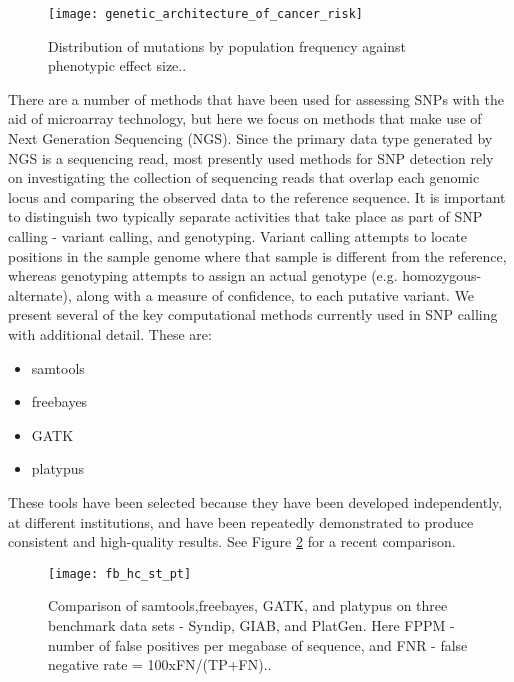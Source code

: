 \begin{figure}[H]
    \texttt{[image: genetic\_architecture\_of\_cancer\_risk]}
    \centering
    \caption {Distribution of mutations by population frequency against phenotypic effect size.\autocite{weitzel2011genetics}.}
    \label{fig:genetic_architecture_of_cancer_risk}
\end{figure}

There are a number of methods that have been used for assessing SNPs with the aid of microarray technology\autocite{heller2002dna}, but here we focus on methods that make use of Next Generation Sequencing (NGS). Since the primary data type generated by NGS is a sequencing read, most presently used methods for SNP detection rely on investigating the collection of sequencing reads that overlap each genomic locus and comparing the observed data to the reference sequence. It is important to distinguish two typically separate activities that take place as part of SNP calling - variant calling, and genotyping. Variant calling attempts to locate positions in the sample genome where that sample is different from the reference, whereas genotyping attempts to assign an actual genotype (e.g. homozygous-alternate), along with a measure of confidence, to each putative variant. We present several of the key computational methods currently used in SNP calling with additional detail. These are:

\begin{itemize}
    \item samtools
    \item freebayes
    \item GATK
    \item platypus
\end{itemize}

These tools have been selected because they have been developed independently, at different institutions, and have been repeatedly demonstrated to produce consistent and high-quality results. See Figure \ref{fig:fb_hc_st_pt} for a recent comparison.

\begin{figure}[H]
    \texttt{[image: fb\_hc\_st\_pt]}
    \centering
    \caption {Comparison of samtools,freebayes, GATK, and platypus on three benchmark data sets - Syndip, GIAB, and PlatGen. Here FPPM - number of false positives per megabase of sequence, and FNR - false negative rate = 100xFN/(TP+FN).\autocite{li2018synthetic}.}
    \label{fig:fb_hc_st_pt}
\end{figure}

